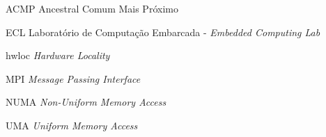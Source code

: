 \listoffigures*
\cleardoublepage
\listoftables*
\cleardoublepage
\begin{siglas}
	\item[ACMP] Ancestral Comum Mais Próximo
	\item[ECL]  Laboratório de Computação Embarcada - \textit{Embedded Computing Lab}
	\item[hwloc] \textit{Hardware Locality}
	\item[MPI]  \textit{Message Passing Interface}
	\item[NUMA] \textit{Non-Uniform Memory Access}
	\item[UMA]  \textit{Uniform Memory Access}
\end{siglas}

\tableofcontents*
\cleardoublepage
